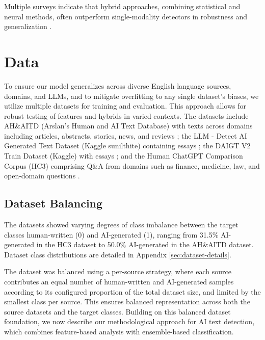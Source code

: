 \documentclass[11pt]{article}
\begin{document}
Multiple surveys indicate that hybrid approaches, combining statistical and neural methods, often outperform single-modality detectors in robustness and generalization \citep{wu-etal-2025-survey, su2024robustdetectionllmgeneratedtext}.

\section{Data}
\label{sec:data}

To ensure our model generalizes across diverse English language sources, domains, and LLMs, and to mitigate overfitting to any single dataset's biases, we utilize multiple datasets for training and evaluation. This approach allows for robust testing of features and hybrids in varied contexts. The datasets include AH\&AITD (Arslan's Human and AI Text Database) with texts across domains including articles, abstracts, stories, news, and reviews \citep{akram2023ahaitd}; the LLM - Detect AI Generated Text Dataset (Kaggle sunilthite) containing essays \citep{thite2023llm}; the DAIGT V2 Train Dataset (Kaggle) with essays \citep{deotte2023daigtv2}; and the Human ChatGPT Comparison Corpus (HC3) comprising Q\&A from domains such as finance, medicine, law, and open-domain questions \citep{guo-etal-2023-hc3}.

\subsection{Dataset Balancing}
\label{sec:dataset-balancing}
The datasets showed varying degrees of class imbalance between the target classes human-written (0) and AI-generated (1), ranging from 31.5\% AI-generated in the HC3 dataset to 50.0\% AI-generated in the AH\&AITD dataset. Dataset class distributions are detailed in Appendix \ref{sec:dataset-details}.

The dataset was balanced using a per-source strategy, where each source contributes an equal number of human-written and AI-generated samples according to its configured proportion of the total dataset size, and limited by the smallest class per source. This ensures balanced representation across both the source datasets and the target classes. Building on this balanced dataset foundation, we now describe our methodological approach for AI text detection, which combines feature-based analysis with ensemble-based classification.
\end{document}
